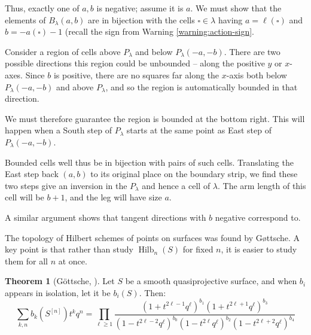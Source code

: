 \documentclass{amsart}[12pt]
\theoremstyle{definition}
\newtheorem{theorem}[dummy]{Theorem}
\DeclareMathOperator{\Hilb}{Hilb}
\begin{document}


Thus, exactly one of $a,b$ is negative; assume it is $a$.  We must show that the elements of $B_\lambda(a,b)$ are in bijection with the cells $\square\in\lambda$ having  $a=\ell(\square)$ and $b=-a(\square)-1$ (recall the sign from Warning \ref{warning:action-sign}.

Consider a region of cells above $P_\lambda$ and below $P_\lambda(-a,-b)$.  There are two possible directions this region could be unbounded -- along the positive $y$ or $x$-axes.  Since $b$ is positive, there are no squares far along the $x$-axis both below $P_\lambda(-a,-b)$  and above $P_\lambda$, and so the region is automatically bounded in that direction.  

We must therefore guarantee the region is bounded at the bottom right.  This will happen when a South step of $P_\lambda$ starts at the same point as East step of $P_\lambda(-a,-b)$.  

Bounded cells well thus be in bijection with pairs of such cells.  Translating the East step back $(a,b)$ to its original place on the boundary strip, we find these two steps give an inversion in the $P_\lambda$ and hence a cell of $\lambda$.  The arm length of this cell will be $b+1$, and the leg will have size $a$. 

A similar argument shows that tangent directions with $b$ negative correspond to. 



The topology of Hilbert schemes of points on surfaces was found by G\o ttsche.  A key point is that rather than study $\Hilb_n(S)$ for fixed $n$, it is easier to study them for all $n$ at once.


\begin{theorem}[G\"ottsche, \cite{gottsche}]
Let $S$ be a smooth quasiprojective surface, and when $b_i$ appears in isolation, let it be $b_i(S)$.  Then:
$$\sum_{k,n} b_k(S^{[n]})t^k q^n=\prod_{\ell\geq 1} \frac{(1+t^{2\ell-1}q^\ell)^{b_1}(1+t^{2\ell+1}q^\ell)^{b_3}}{(1-t^{2\ell-2}q^\ell)^{b_0}(1-t^{2\ell}q^\ell)^{b_2}(1-t^{2\ell+2}q^\ell)^{b_4}}$$
\end{theorem}
\end{document}
